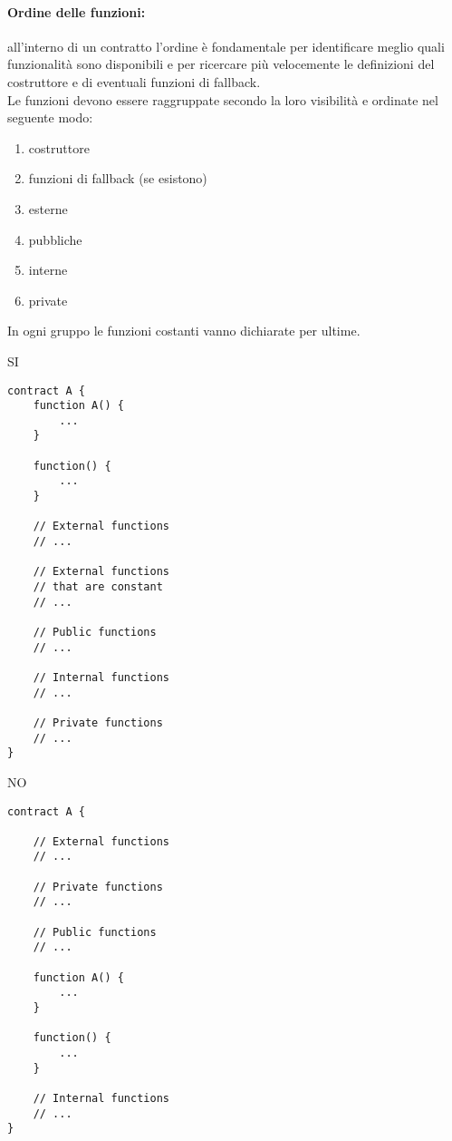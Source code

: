 \documentclass[../ProcessiPrimari.tex]{subfiles}
\begin{document}
\paragraph*{Ordine delle funzioni: }
all'interno di un contratto l'ordine è fondamentale per identificare meglio quali funzionalità sono disponibili e per ricercare più velocemente le definizioni del costruttore e di eventuali funzioni di fallback.\\
Le funzioni devono essere raggruppate secondo la loro visibilità e ordinate nel seguente modo:
\begin{enumerate}
\item costruttore
\item funzioni di fallback (se esistono)
\item esterne
\item pubbliche
\item interne
\item private
\end{enumerate}
In ogni gruppo le funzioni costanti vanno dichiarate per ultime.
\begin{center}{
\begin{minipage}{6cm}
{\begin{center}SI\end{center}}
\begin{Verbatim}[frame=single]
contract A {
    function A() {
        ...
    }

    function() {
        ...
    }

    // External functions
    // ...

    // External functions 
    // that are constant
    // ...

    // Public functions
    // ...

    // Internal functions
    // ...

    // Private functions
    // ...
}
\end{Verbatim}
\end{minipage}
\hfill
\begin{minipage}{6cm}
{\begin{center}NO\end{center}}
\begin{Verbatim}[frame=single]
contract A {

    // External functions
    // ...

    // Private functions
    // ...

    // Public functions
    // ...

    function A() {
        ...
    }

    function() {
        ...
    }

    // Internal functions
    // ...
}



\end{Verbatim}
\end{minipage}
}
\end{center}
\end{document}
